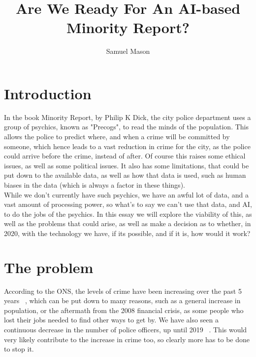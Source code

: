 \documentclass[12pt]{amsart}
\title{Are We Ready For An AI-based Minority Report?}
\author{Samuel Mason}
\begin{document}
    \maketitle
    \tableofcontents


    \section{Introduction}\label{sec:introduction}  %

    In the book Minority Report, by Philip K Dick, the city police department uses a group of psychics, known as
    "Precogs"\cite{mr-book}, to read
    the minds of the population.
    This allows the police to predict where, and when a crime will be committed by someone, which hence leads to a vast
    reduction in crime for the city, as the police could arrive before the crime, instead of after.
    Of course this raises some ethical issues, as well as some political issues.
    It also has some limitations, that could be put down to the available data, as well as how that data is used,
    such as human biases in the data (which is always a factor in these things).
    \\

    While we don't currently have such psychics, we have an awful lot of data, and a vast amount of processing power, so
    what's to say we can't use that data, and AI, to do the jobs of the psychics.
    In this essay we will explore the viability of this, as well as the problems that could arise, as well as make a
    decision as to whether, in 2020, with the technology we have, if its possible, and if it is, how would it
    work?


    \section{The problem}\label{sec:the-problem}  %

    According to the ONS, the levels of crime have been increasing over the past 5 years ~\cite{ons-crime}, which can be
    put down to many reasons, such as a general increase in population, or the aftermath from the 2008 financial crisis,
    as some people who lost their jobs needed to find other ways to get by.
    We have also seen a continuous decrease in the number of police officers, up until 2019 ~\cite{ho-pw}.
    This would very likely contribute to the increase in crime too, so clearly more has to be done to stop it.
\end{document}
